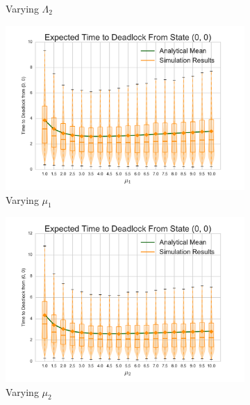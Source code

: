 \documentclass{article}
\numberwithin{equation}{section}
\begin{document}
\begin{figure}[!htbp]
\begin{subfigure}[b]{0.333\textwidth}
    \caption{Varying $\Lambda_2$}
    \label{fig:2Nms_L2}
  \end{subfigure}
  \begin{subfigure}[b]{0.333\textwidth}
    \includegraphics[width=\textwidth]{images/varymu1_2Nms}
    \caption{Varying $\mu_1$}
    \label{fig:2Nms_mu1}
  \end{subfigure}
  \begin{subfigure}[b]{0.333\textwidth}
    \includegraphics[width=\textwidth]{images/varymu2_2Nms}
    \caption{Varying $\mu_2$}
    \label{fig:2Nms_mu2}
  \end{subfigure}
  \begin{subfigure}[b]{0.333\textwidth}

\end{subfigure}
\end{figure}
\end{document}
